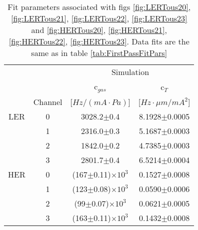 \begin{table}[htb]
	\centering
	\begin{tabular}{ cccc }
		&	& \multicolumn{2}{c}{Simulation} \\	
		& 	& c$_{gas}$	& c$_{T}$	\\ 
		&Channel &  [$Hz/(mA\cdot Pa)$]	& [$Hz\cdot\mu m/mA^{2}$]\\ \hline \hline
	LER	&0	& 3028.2$\pm$0.4& 8.1928$\pm$0.0005\\
		&1	& 2316.0$\pm$0.3& 5.1687$\pm$0.0003		\\
		&2	& 1842.0$\pm$0.2& 4.7385$\pm$0.0003		\\
		&3	& 2801.7$\pm$0.4& 6.5214$\pm$0.0004		\\ \hline	
	HER	&0	& (167$\pm$0.11)$\times10^{3}$& 0.1527$\pm$0.0008	\\
		&1	& (123$\pm$0.08)$\times10^{3}$& 0.0590$\pm$0.0006	\\
		&2	& (99$\pm$0.07)$\times10^{3}$ & 0.0621$\pm$0.0005	\\
		&3	& (163$\pm$0.11)$\times10^{3}$& 0.1432$\pm$0.0008	\\ \hline
	\end{tabular}
	\caption[Fit parameters associated with figs \ref{fig:LERTous20}, \ref{fig:LERTous21}, \ref{fig:LERTous22}, \ref{fig:LERTous23} and \ref{fig:HERTous20}, \ref{fig:HERTous21}, \ref{fig:HERTous22}, \ref{fig:HERTous23}]{Fit parameters associated with figs \ref{fig:LERTous20}, \ref{fig:LERTous21}, \ref{fig:LERTous22}, \ref{fig:LERTous23} and \ref{fig:HERTous20}, \ref{fig:HERTous21}, \ref{fig:HERTous22}, \ref{fig:HERTous23}. Data fits are the same as in table \ref{tab:FirstPassFitPars}}
	\label{tab:SecondPassFitPars}
\end{table}


